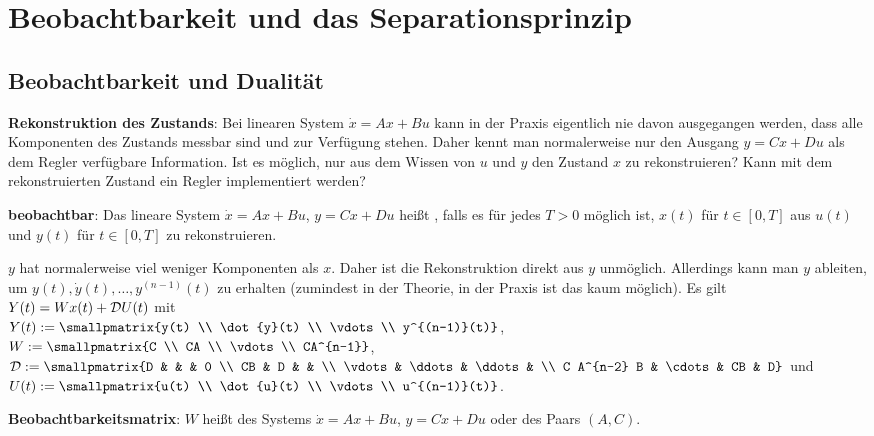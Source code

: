 \section{%
    Beobachtbarkeit und das Separationsprinzip%
}

\subsection{%
    Beobachtbarkeit und Dualität%
}

\textbf{Rekonstruktion des Zustands}:
Bei linearen System $\dot{x} = Ax + Bu$ kann in der Praxis eigentlich nie davon ausgegangen werden,
dass alle Komponenten des Zustands messbar sind und zur Verfügung stehen.
Daher kennt man normalerweise nur den Ausgang $y = Cx + Du$
als dem Regler verfügbare Information.
Ist es möglich, nur aus dem Wissen von $u$ und $y$ den Zustand $x$ zu rekonstruieren?
Kann mit dem rekonstruierten Zustand ein Regler implementiert werden?

\textbf{beobachtbar}:
Das lineare System $\dot{x} = Ax + Bu$, $y = Cx + Du$ heißt ,
falls es für jedes $T > 0$ möglich ist, $x(t)$ für $t \in [0, T]$ aus
$u(t)$ und $y(t)$ für $t \in [0, T]$ zu rekonstruieren.

\linie

$y$ hat normalerweise viel weniger Komponenten als $x$.
Daher ist die Rekonstruktion direkt aus $y$ unmöglich.
Allerdings kann man $y$ ableiten, um $y(t), \dot{y}(t), \dotsc, y^{(n-1)}(t)$ zu erhalten
(zumindest in der Theorie, in der Praxis ist das kaum möglich).
Es gilt $Y(t) = W x(t) + \mathcal{D} U(t)$ mit\\
$Y(t) := \smallpmatrix{y(t) \\ \dot{y}(t) \\ \vdots \\ y^{(n-1)}(t)}$,
$W := \smallpmatrix{C \\ CA \\ \vdots \\ CA^{n-1}}$,
$\D := \smallpmatrix{D & & & 0 \\ CB & D & & \\ \vdots & \ddots & \ddots & \\
C A^{n-2} B & \cdots & CB & D}$ und
$U(t) := \smallpmatrix{u(t) \\ \dot{u}(t) \\ \vdots \\ u^{(n-1)}(t)}$.

\textbf{Beobachtbarkeitsmatrix}:
$W$ heißt  des Systems
$\dot{x} = Ax + Bu$, $y = Cx + Du$
oder des Paars $(A, C)$.

